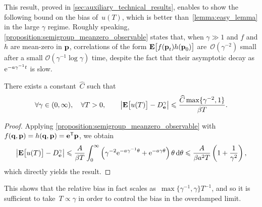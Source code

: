 \documentclass[11pt,a4paper]{article}
\begin{document}
This result, proved in \cref{sec:auxiliary_technical_results},
enables to show the following bound on the bias of~$u(T)$,
which is better than~\cref{lemma:easy_lemma} in the large $\gamma$ regime.
Roughly speaking, \cref{proposition:semigroup_meanzero_observable} states that,
when $\gamma \gg 1$ and $f$ and $h$ are mean-zero in $\boldsymbol{\mathbf p}$,
correlations of the form $\mathbf{E} \bigl[ f(\boldsymbol{\mathbf p}_t) h(\boldsymbol{\mathbf p}_0) \bigr]$ are~$\mathcal O(\gamma^{-2})$ small after a small $\mathcal O(\gamma^{-1} \log \gamma)$ time,
despite the fact that their asymptotic decay as~$\mathrm{e}^{- a \gamma^{-1} t}$ is slow.
\begin{corollary}
    \label{corollary:better_bias}
    There exists a constant~$\widehat C$ such that
    \begin{equation}
        \label{eq:bias}
        \forall \gamma \in (0, \infty),
        \quad
        \forall T > 0,
        \qquad
        \abs{\expect \bigl[u(T)\bigr] - D_{\vect e}^{\gamma}}
        \leq
        \frac{\widehat C \max \{\gamma^{-2}, 1\}}{\beta T}.
    \end{equation}
\end{corollary}
\begin{proof}
    Applying \cref{proposition:semigroup_meanzero_observable} with $f(\boldsymbol{\mathbf q}, \boldsymbol{\mathbf p}) = h(\boldsymbol{\mathbf q}, \boldsymbol{\mathbf p}) = \boldsymbol{\mathbf e}^\mathsf T \boldsymbol{\mathbf p}$, we obtain
    \begin{equation}
        \label{eq:refined_bound_for_u}
        \abs{\expect \bigl[u(T)\bigr] - D^{\gamma}_{\vect e}}
        \leq \frac{A}{\beta T} \int_{0}^{\infty} \left( \gamma^{-2} \e^{- a \gamma^{-1} \theta} + \e^{-a  \gamma \theta} \right)  \theta \, \d \theta
        \leq \frac{A}{\beta a^2 T} \left(1 + \frac{1}{\gamma^2} \right),
    \end{equation}
    which directly yields the result.
\end{proof}
This shows that the relative bias in fact scales as~$\max\{\gamma^{-1}, \gamma\} T^{-1}$,
and so it is sufficient to take~$T \propto \gamma$ in order to control the bias in the overdamped limit.
\end{document}
